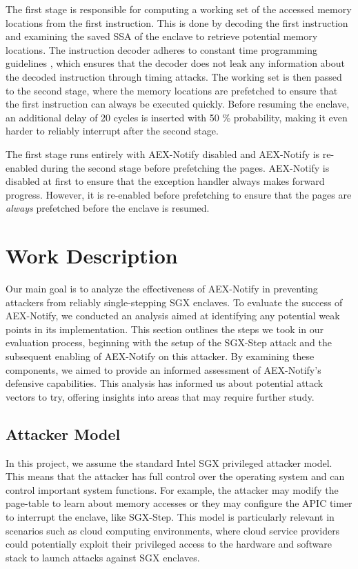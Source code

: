 \documentclass{llncs}
\begin{document}
The first stage is responsible for computing a working set of the accessed
memory locations from the first instruction.
This is done by decoding the first instruction and examining the saved SSA of
the enclave to retrieve potential memory locations.
The instruction decoder adheres to constant time programming guidelines
\cite{Intel22}, which ensures that the decoder does not leak any information
about the decoded instruction through timing attacks.
The working set is then passed to the second stage, where the memory locations
are prefetched to ensure that the first instruction can always be executed
quickly.
Before resuming the enclave, an additional delay of 20 cycles is inserted with
50 \% probability, making it even harder to reliably interrupt after the second
stage.


The first stage runs entirely with AEX-Notify disabled
and AEX-Notify is re-enabled during the second stage before prefetching the pages.
AEX-Notify is disabled at first to ensure that the exception handler always
makes forward progress.
However, it is re-enabled before prefetching to ensure that the pages are
\emph{always} prefetched before the enclave is resumed.

\section{Work Description}

Our main goal is to analyze the effectiveness of AEX-Notify
in preventing attackers from reliably single-stepping SGX enclaves.
To evaluate the success of AEX-Notify, we conducted an analysis aimed at
identifying any potential weak points in its implementation.
This section outlines the steps we took in our evaluation process,
beginning with the setup of the SGX-Step attack and
the subsequent enabling of AEX-Notify on this attacker.
By examining these components,
we aimed to provide an informed assessment of AEX-Notify’s defensive capabilities.
This analysis has informed us about potential attack vectors to try,
offering insights into areas that may require further study.

\subsection{Attacker Model}

In this project, we assume the standard Intel SGX privileged attacker model.
This means that the attacker has full control over the operating system
and can control important system functions.
For example, the attacker may modify the page-table to learn about memory accesses
or they may configure the APIC timer to interrupt the enclave, like SGX-Step.
This model is particularly relevant in scenarios such as cloud computing
environments, where cloud service providers could potentially exploit their
privileged access to the hardware and software stack to launch attacks against SGX enclaves.
\end{document}

